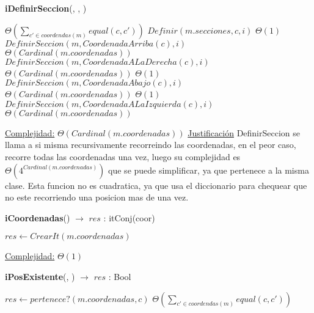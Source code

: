 \begin{Algoritmos}
\begin{algorithm}[H]{\textbf{iDefinirSeccion}(, , )}
    	\begin{algorithmic}[1]
				 \Comment $\Theta\left(\displaystyle\sum_{c' \in coordendas(m)}equal(c,c')\right)$
                \State $Definir(m.secciones, c, i)$ \Comment $\Theta(1)$
                \State $DefinirSeccion(m, CoordenadaArriba(c), i)$ \Comment $\Theta(Cardinal(m.coordenadas))$
                \State $DefinirSeccion(m, CoordenadaALaDerecha(c), i)$ \Comment $\Theta(Cardinal(m.coordenadas))$ 
                 \Comment $\Theta(1)$
                    \State $DefinirSeccion(m, CoordenadaAbajo(c), i)$ \Comment $\Theta(Cardinal(m.coordenadas))$ 
                \EndIf
                 \Comment $\Theta(1)$
                    \State $DefinirSeccion(m, CoordenadaALaIzquierda(c), i)$ \Comment $\Theta(Cardinal(m.coordenadas))$ 
                \EndIf
            \EndIf

			\medskip
			\Statex \underline{Complejidad:} $\Theta(Cardinal(m.coordenadas))$
            \Statex \underline{Justificación} DefinirSeccion se llama a si misma recursivamente recorreindo las coordenadas, en el peor caso, recorre todas las coordenadas una vez, luego su complejidad es $\Theta(4^{Cardinal(m.coordenadas)})$ que se puede simplificar, ya que pertenece a la misma clase. Esta funcion no es cuadratica, ya que usa el diccionario para chequear que no este recorriendo una posicion mas de una vez. 
    	\end{algorithmic}
\end{algorithm}

\begin{algorithm}[H]{\textbf{iCoordenadas}() $\to$ $res$ : itConj(coor)}
    	\begin{algorithmic}[1]
			\State $res \gets CrearIt(m.coordenadas)$ 
			
			\medskip
			\Statex \underline{Complejidad:} $\Theta(1)$
    	\end{algorithmic}
\end{algorithm}

\begin{algorithm}[H]{\textbf{iPosExistente}(, ) $\to$ $res$ : Bool}
    	\begin{algorithmic}[1]
			\State $res \gets pertenece?(m.coordenadas, c)$ \Comment  $\Theta\left(\displaystyle\sum_{c' \in coordendas(m)}equal(c,c')\right)$
			

\end{algorithmic}
\end{algorithm}
\end{Algoritmos}
